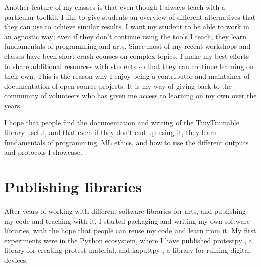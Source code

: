 Another feature of my classes is that even though I always teach with a particular toolkit, I like to give students an overview of different alternatives that they can use to achieve similar results. I want my student to be able to work in an agnostic way; even if they don't continue using the tools I teach, they learn fundamentals of programming and arts. Since most of my recent workshops and classes have been short crash courses on complex topics, I make my best efforts to share additional resources with students so that they can continue learning on their own. This is the reason why I enjoy being a contributor and maintainer of documentation of open source projects. It is my way of giving back to the community of volunteers who has given me access to learning on my own over the years.

I hope that people find the documentation and writing of the TinyTrainable library useful, and that even if they don't end up using it, they learn fundamentals of programming, \acrshort{ML} ethics, and how to use the different outputs and protocols I showcase.

\section{Publishing libraries}

After years of working with different software libraries for arts, and publishing my code and teaching with it, I started packaging and writing my own software libraries, with the hope that people can reuse my code and learn from it. My first experiments were in the Python ecosystem, where I have published protestpy \cite{website-pypi-protestpy}, a library for creating protest material, and kaputtpy \cite{website-pypi-kaputtpy}, a library for ruining digital devices.

